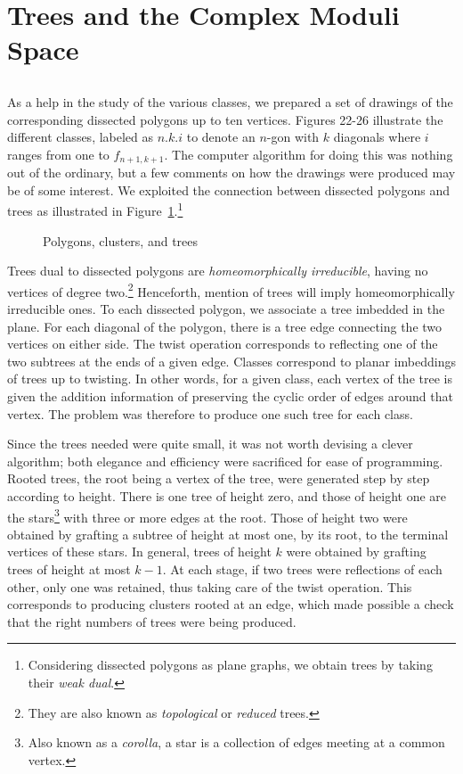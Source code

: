 \documentclass[10pt]{amsart}
\begin{document}
    \section {Trees and the Complex Moduli Space}
    
    \subsection{}
    As a help in the study of the various classes, we prepared a set of drawings of the corresponding dissected polygons up to ten vertices. Figures 22-26 illustrate the different classes, labeled as $n.k.i$ to denote an $n$-gon with $k$ diagonals where $i$ ranges from one to $f_{n+1,k+1}$. The computer algorithm for doing this was nothing out of the ordinary, but a few comments on how the drawings were produced may be of some interest. We exploited the connection between dissected polygons and trees as illustrated in Figure~\ref{f:pct}.\footnote{Considering dissected polygons as plane graphs, we obtain trees by taking their {\em weak dual}.}
    \begin{figure}[h]
    \caption{Polygons, clusters, and trees}
    \label{f:pct}
    \end{figure}
    Trees dual to dissected polygons are {\em homeomorphically irreducible}, having no vertices of degree two.\footnote{They are also known as {\em topological} or {\em reduced} trees.} Henceforth, mention of trees will imply homeomorphically irreducible ones. To each dissected polygon, we associate a tree imbedded in the plane. For each diagonal of the polygon, there is a tree edge connecting the two vertices on either side. The twist operation corresponds to reflecting one of the two subtrees at the ends of a given edge. Classes correspond to planar imbeddings of trees up to twisting.  In other words, for a given class, each vertex of the tree is given the addition information of preserving the cyclic order of edges around that vertex. The problem was therefore to produce one such tree for each class.
    
    Since the trees needed were quite small, it was not worth devising a clever algorithm; both elegance and efficiency were sacrificed for ease of programming.  Rooted trees, the root being a vertex of the tree, were generated step by step according to height.   There is one tree of height zero, and those of height one are the stars\footnote{Also known as a {\em corolla}, a star is a collection of edges meeting at a common vertex.} with three or more edges at the root.  Those of height two were obtained by grafting a subtree of height at most one, by its root, to the terminal vertices of these stars.  In general, trees of height $k$ were obtained by grafting trees of height at most $k - 1$. At each stage, if two trees were reflections of each other, only one was retained, thus taking care of the twist operation.  This corresponds to producing clusters rooted at an edge, which made possible a check that the right numbers of trees were being produced.
    
\end{document}
